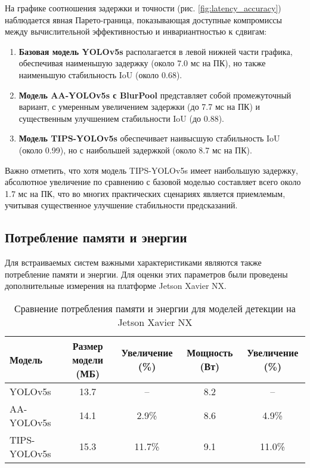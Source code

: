 На графике соотношения задержки и точности (рис. \ref{fig:latency_accuracy}) наблюдается явная Парето-граница, показывающая доступные компромиссы между вычислительной эффективностью и инвариантностью к сдвигам:

\begin{enumerate}
    \item \textbf{Базовая модель YOLOv5s} располагается в левой нижней части графика, обеспечивая наименьшую задержку (около 7.0 мс на ПК), но также наименьшую стабильность IoU (около 0.68).
    
    \item \textbf{Модель AA-YOLOv5s с BlurPool} представляет собой промежуточный вариант, с умеренным увеличением задержки (до 7.7 мс на ПК) и существенным улучшением стабильности IoU (до 0.88).
    
    \item \textbf{Модель TIPS-YOLOv5s} обеспечивает наивысшую стабильность IoU (около 0.99), но с наибольшей задержкой (около 8.7 мс на ПК).
\end{enumerate}

Важно отметить, что хотя модель TIPS-YOLOv5s имеет наибольшую задержку, абсолютное увеличение по сравнению с базовой моделью составляет всего около 1.7 мс на ПК, что во многих практических сценариях является приемлемым, учитывая существенное улучшение стабильности предсказаний.

\subsection{Потребление памяти и энергии}
\label{experiments:performance:memory_energy}

Для встраиваемых систем важными характеристиками являются также потребление памяти и энергии. Для оценки этих параметров были проведены дополнительные измерения на платформе Jetson Xavier NX.

\begin{table}[ht]
\centering
\caption{Сравнение потребления памяти и энергии для моделей детекции на Jetson Xavier NX}
\label{tab:memory_energy}
\begin{tabular}{|l|c|c|c|c|}
\hline
\textbf{Модель} & \textbf{Размер модели (МБ)} & \textbf{Увеличение (\%)} & \textbf{Мощность (Вт)} & \textbf{Увеличение (\%)} \\ \hline
YOLOv5s & 13.7 & -- & 8.2 & -- \\ \hline
AA-YOLOv5s & 14.1 & 2.9\% & 8.6 & 4.9\% \\ \hline
TIPS-YOLOv5s & 15.3 & 11.7\% & 9.1 & 11.0\% \\ \hline
\end{tabular}
\end{table}

